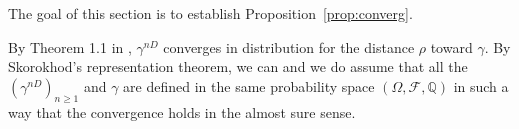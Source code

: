 \documentclass[11pt]{article}
\begin{document}

The goal of this section is to establish Proposition~\ref{prop:converg}.

By Theorem 1.1 in \cite{LawlerViklund}, $\gamma^{nD}$ converges in distribution for the distance $\rho$ toward $\gamma$. By Skorokhod's representation theorem, we can and we do assume that all the $(\gamma^{nD})_{n\geq 1}$ and $\gamma$ are defined in the same probability space $(\Omega,\mathcal{F},\mathbb{Q})$ in such a way that the convergence holds in the almost sure sense.
\end{document}
